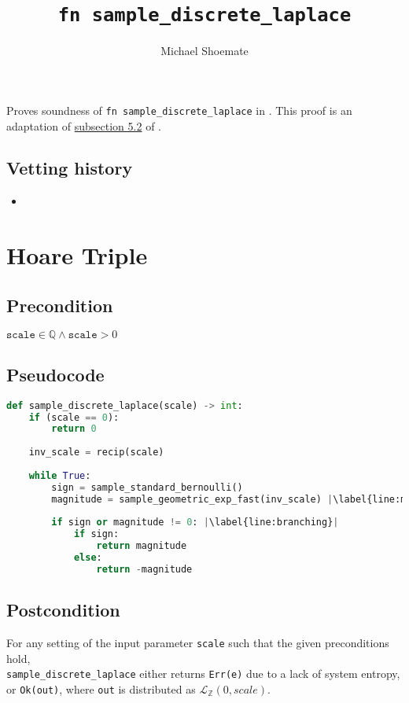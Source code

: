 \documentclass{article}
\title{\texttt{fn sample\_discrete\_laplace}}
\author{Michael Shoemate}
\begin{document}
\maketitle

\contrib
Proves soundness of \texttt{fn sample\_discrete\_laplace} in .
This proof is an adaptation of \href{https://arxiv.org/pdf/2004.00010.pdf#subsection.5.2}{subsection 5.2} of \cite{CKS20}.

\subsection*{Vetting history}
\begin{itemize}
    \item {}
\end{itemize}

\section{Hoare Triple}
\subsection*{Precondition}
$\texttt{scale} \in \mathbb{Q} \land \texttt{scale} > 0$

\subsection*{Pseudocode}        
\begin{lstlisting}[language=Python, escapechar=|]
def sample_discrete_laplace(scale) -> int:
    if (scale == 0):
        return 0
        
    inv_scale = recip(scale)
    
    while True:
        sign = sample_standard_bernoulli()
        magnitude = sample_geometric_exp_fast(inv_scale) |\label{line:magnitude}|
        
        if sign or magnitude != 0: |\label{line:branching}|
            if sign:
                return magnitude
            else:
                return -magnitude
\end{lstlisting}

\subsection*{Postcondition}
\label{postcondition}
For any setting of the input parameter \texttt{scale} such that the given preconditions hold, \\
\texttt{sample\_discrete\_laplace} either returns \texttt{Err(e)} due to a lack of system entropy,
or \texttt{Ok(out)}, where \texttt{out} is distributed as $\mathcal{L}_\mathbb{Z}(0, scale)$.
\end{document}
